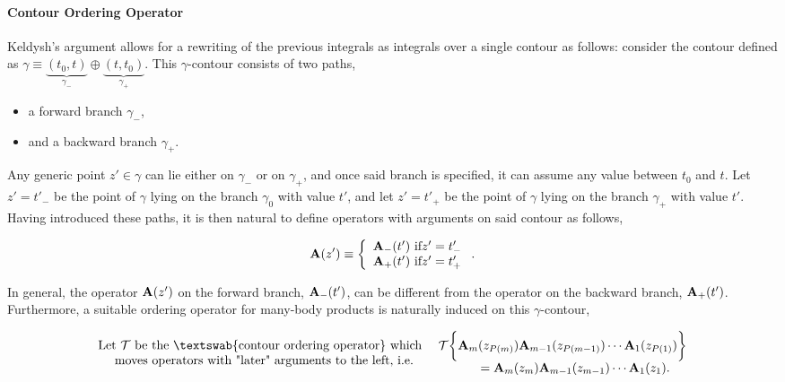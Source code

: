 \paragraph{Contour Ordering Operator}

Keldysh's argument allows for a rewriting of the previous integrals as integrals over a single contour as follows: consider the contour defined as $\gamma \equiv \underbrace{(t_0, t)}_{\gamma_{-}} \oplus \underbrace{(t,t_0)}_{\gamma_{+}}$. This $\gamma$-contour consists of two paths,

\begin{itemize}
    \item a forward branch $\gamma_{-}$,
    \item and a backward branch $\gamma_{+}$.
\end{itemize}

Any generic point $z' \in \gamma$ can lie either on $\gamma_-$ or on $\gamma_+$, and once said branch is specified, it can assume any value between $t_0$ and $t$.
Let $z' = t'_-$ be the point of $\gamma$ lying on the branch $\gamma_0$ with value $t'$, and let $z' = t'_+$ be the point of $\gamma$ lying on the branch $\gamma_+$ with value $t'$.
Having introduced these paths, it is then natural to define operators with arguments on said contour as follows, 

\begin{equation}
    {\bf A}(z') \equiv \left\{
        \begin{array}{cc}
             {\bf A}_{-}(t') \textnormal{ if} z' = t'_{-} \\
             {\bf A}_{+}(t') \textnormal{ if} z' = t'_{+}
        \end{array}
    \right..
\end{equation}

In general, the operator ${\bf A}(z')$ on the forward branch, ${\bf A}_{-}(t')$, can be different from the operator on the backward branch, ${\bf A}_{+}(t')$.
Furthermore, a suitable ordering operator for many-body products is naturally induced on this $\gamma$-contour, 

\begin{equation}
    \begin{array}{cc}
         \textnormal{Let $\mathcal{T}$ be the \textswab{contour ordering operator} which } \\
         \textnormal{ moves operators with "later" arguments to the left, i.e.}
    \end{array} \begin{array}{cc}
         \mathcal{T} \bigg\{
        {\bf A}_m(z_{P(m)}) {\bf A}_{m-1}(z_{P(m-1)}) \cdots {\bf A}_1(z_{P(1)})
         \bigg\} \\
         \qquad = {\bf A}_m(z_m) {\bf A}_{m-1}(z_{m-1}) \cdots {\bf A}_1(z_1). 
    \end{array}
\end{equation}

